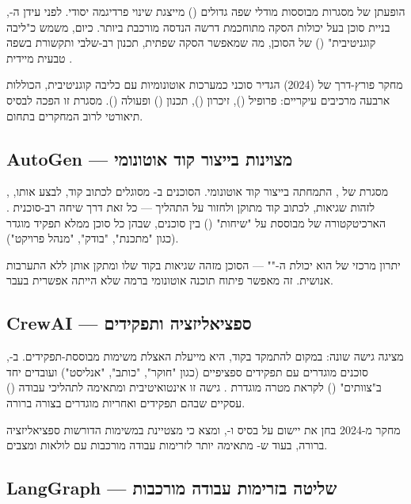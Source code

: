 \documentclass[12pt,a4paper]{article}
\begin{document}
הופעתן של מסגרות  מבוססות מודלי שפה גדולים () מייצגת שינוי פרדיגמה יסודי. לפני עידן ה-, בניית סוכן בעל יכולות הסקה מתוחכמת דרשה הנדסה מורכבת ביותר. כיום,  משמש כ"ליבה קוגניטיבית" () של הסוכן, מה שמאפשר הסקה שפתית, תכנון רב-שלבי ותקשורת בשפה טבעית מיידית \cite{Lyu2024}.

מחקר פורץ-דרך של  (2024) \cite{Meta_Intelligence2024} הגדיר סוכני  כמערכות אוטונומיות עם  כליבה קוגניטיבית, הכוללות ארבעה מרכיבים עיקריים: פרופיל (), זיכרון (), תכנון () ופעולה (). מסגרת זו הפכה לבסיס תיאורטי לרוב המחקרים בתחום.

\subsection{AutoGen — מצוינות בייצור קוד אוטונומי}

, מסגרת  של , התמחתה בייצור קוד אוטונומי. הסוכנים ב- מסוגלים לכתוב קוד, לבצע אותו, לזהות שגיאות, לכתוב קוד מתוקן ולחזור על התהליך --- כל זאת דרך שיחה רב-סוכנית \cite{Reddit_LangChain2024}. הארכיטקטורה של  מבוססת על "שיחות" () בין סוכנים, שבהן כל סוכן ממלא תפקיד מוגדר (כגון "מתכנת", "בודק", "מנהל פרויקט").

יתרון מרכזי של  הוא יכולת ה-"" --- הסוכן מזהה שגיאות בקוד שלו ומתקן אותן ללא התערבות אנושית. זה מאפשר פיתוח תוכנה אוטונומי ברמה שלא הייתה אפשרית בעבר.

\subsection{CrewAI — ספציאליזציה ותפקידים}

 מציגה גישה שונה: במקום להתמקד בקוד, היא מייעלת האצלת משימות מבוססת-תפקידים. ב-, סוכנים מוגדרים עם תפקידים ספציפיים (כגון "חוקר", "כותב", "אנליסט") ועובדים יחד ב"צוותים" () לקראת מטרה מוגדרת \cite{arXiv2411}. גישה זו אינטואיטיבית ומתאימה לתהליכי עבודה () עסקיים שבהם תפקידים ואחריות מוגדרים בצורה ברורה.

מחקר  מ-2024 \cite{arXiv2411} בחן את יישום  על בסיס  ו-, ומצא כי  מצטיינת במשימות הדורשות ספציאליזציה ברורה, בעוד ש- מתאימה יותר לזרימות עבודה מורכבות עם לולאות ומצבים.

\subsection{LangGraph — שליטה בזרימות עבודה מורכבות}
\end{document}

